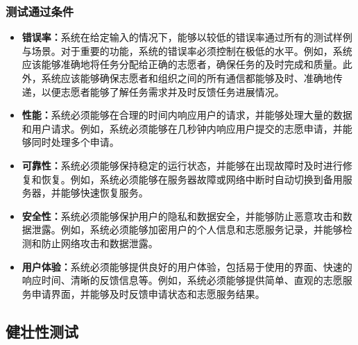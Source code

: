 \subsubsection{测试通过条件}
\begin{itemize}[itemsep=2pt,topsep=0pt,parsep=4pt,itemindent=1em]
\item \textbf{错误率：}系统在给定输入的情况下，能够以较低的错误率通过所有的测试样例与场景。对于重要的功能，系统的错误率必须控制在极低的水平。例如，系统应该能够准确地将任务分配给正确的志愿者，确保任务的及时完成和质量。此外，系统应该能够确保志愿者和组织之间的所有通信都能够及时、准确地传递，以便志愿者能够了解任务需求并及时反馈任务进展情况。

\item \textbf{性能：}系统必须能够在合理的时间内响应用户的请求，并能够处理大量的数据和用户请求。例如，系统必须能够在几秒钟内响应用户提交的志愿申请，并能够同时处理多个申请。

\item \textbf{可靠性：}系统必须能够保持稳定的运行状态，并能够在出现故障时及时进行修复和恢复。例如，系统必须能够在服务器故障或网络中断时自动切换到备用服务器，并能够快速恢复服务。

\item \textbf{安全性：}系统必须能够保护用户的隐私和数据安全，并能够防止恶意攻击和数据泄露。例如，系统必须能够加密用户的个人信息和志愿服务记录，并能够检测和防止网络攻击和数据泄露。

\item \textbf{用户体验：}系统必须能够提供良好的用户体验，包括易于使用的界面、快速的响应时间、清晰的反馈信息等。例如，系统必须能够提供简单、直观的志愿服务申请界面，并能够及时反馈申请状态和志愿服务结果。

\end{itemize}

\subsection{健壮性测试}
